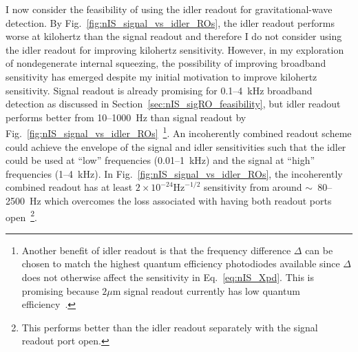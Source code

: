 I now consider the feasibility of using the idler readout for gravitational-wave detection. By Fig.~\ref{fig:nIS_signal_vs_idler_ROs}, the idler readout performs worse at kilohertz than the signal readout and therefore I do not consider using the idler readout for improving kilohertz sensitivity. %
However, in my exploration of nondegenerate internal squeezing, the possibility of improving broadband sensitivity has emerged despite my initial motivation to improve kilohertz sensitivity. Signal readout is already promising for 0.1--4~kHz broadband detection as discussed in Section~\ref{sec:nIS_sigRO_feasibility}, but idler readout performs better from 10--1000~Hz than signal readout by Fig.~\ref{fig:nIS_signal_vs_idler_ROs}~\footnote{Another benefit of idler readout is that the frequency difference $\Delta$ can be chosen to match the highest quantum efficiency photodiodes available since $\Delta$ does not otherwise affect the sensitivity in Eq.~\ref{eq:nIS_Xpd}. This is promising because $2 \mu\text{m}$ signal readout currently has low quantum efficiency~\cite{singh_2019}.}. %
An incoherently combined readout scheme could achieve the envelope of the signal and idler sensitivities such that the idler could be used at ``low'' frequencies (0.01--1~kHz) and the signal at ``high'' frequencies (1--4~kHz). %
In Fig.~\ref{fig:nIS_signal_vs_idler_ROs}, the incoherently combined readout has at least $2\times10^{-24}\text{Hz}^{-1/2}$ sensitivity from around $\sim$~80--2500~Hz which overcomes the loss associated with having both readout ports open~\footnote{This performs better than the idler readout separately with the signal readout port open.}. %
